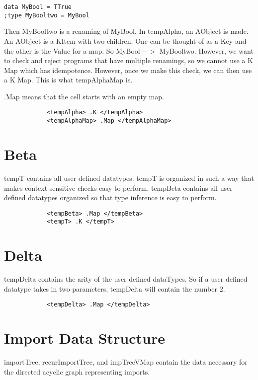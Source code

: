 \begin{lstlisting}
data MyBool = TTrue
;type MyBooltwo = MyBool
\end{lstlisting}

Then MyBooltwo is a renaming of MyBool. In tempAlpha, an AObject is made. An AObject is a KItem with two children. One can be thought of as a Key and the other is the Value for a map. So MyBool $->$ MyBooltwo. However, we want to check and reject programs that have multiple renamings, so we cannot use a K Map which has idempotence. However, once we make this check, we can then use a K Map. This is what tempAlphaMap is.

.Map means that the cell starts with an empty map.

\begin{lstlisting}
            <tempAlpha> .K </tempAlpha>
            <tempAlphaMap> .Map </tempAlphaMap>
\end{lstlisting}

\section{Beta}

tempT contains all user defined datatypes. tempT is organized in such a way that makes context sensitive checks easy to perform. tempBeta contains all user defined datatypes organized so that type inference is easy to perform.
\begin{lstlisting}
            <tempBeta> .Map </tempBeta>
            <tempT> .K </tempT>
\end{lstlisting}

\section{Delta}

tempDelta contains the arity of the user defined dataTypes. So if a user defined datatype takes in two parameters, tempDelta will contain the number 2.

\begin{lstlisting}
            <tempDelta> .Map </tempDelta>
\end{lstlisting}

\section{Import Data Structure}

importTree, recurImportTree, and impTreeVMap contain the data necessary for the directed acyclic graph representing imports.

